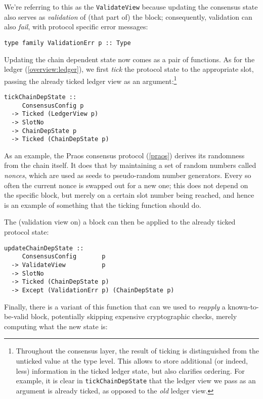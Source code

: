 We're referring to this as the \lstinline!ValidateView! because updating the
consensus state also serves as \emph{validation} of (that part of) the block;
consequently, validation can also \emph{fail}, with protocol specific error
messages:

\begin{lstlisting}
type family ValidationErr p :: Type
\end{lstlisting}

Updating the chain dependent state now comes as a pair of functions. As for the ledger
(\cref{overview:ledger}), we first \emph{tick} the protocol state to the
appropriate slot, passing the already ticked ledger view as an
argument:\footnote{Throughout the consensus layer, the result of ticking is
distinguished from the unticked value at the type level. This allows to store
additional (or indeed, less) information in the ticked ledger state, but also
clarifies ordering. For example, it is clear in \lstinline!tickChainDepState!
that the ledger view we pass as an argument is already ticked, as opposed to the
\emph{old} ledger view.}

\begin{lstlisting}
tickChainDepState ::
     ConsensusConfig p
  -> Ticked (LedgerView p)
  -> SlotNo
  -> ChainDepState p
  -> Ticked (ChainDepState p)
\end{lstlisting}

As an example, the Praos consensus protocol (\cref{praos}) derives its
randomness from the  chain itself. It does that by maintaining a set of random
numbers called \emph{nonces}, which are used as seeds to pseudo-random number
generators. Every so often the current nonce is swapped out for a new one; this
does not depend on the specific block, but merely on a certain slot number being
reached, and hence is an example of something that the ticking function should
do.

The (validation view on) a block can then be applied to the already ticked
protocol state:

\begin{lstlisting}
updateChainDepState ::
     ConsensusConfig       p
  -> ValidateView          p
  -> SlotNo
  -> Ticked (ChainDepState p)
  -> Except (ValidationErr p) (ChainDepState p)
\end{lstlisting}

Finally, there is a variant of this function that can we used to \emph{reapply}
a known-to-be-valid block, potentially skipping expensive cryptographic checks,
merely computing what the new state is:

